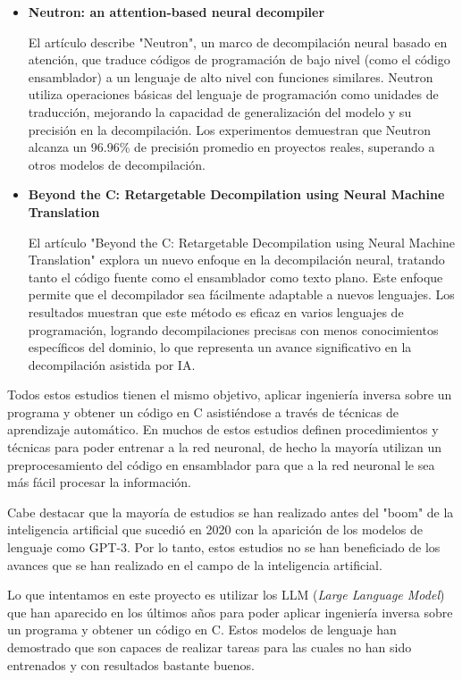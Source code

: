 \begin{itemize}
\item \textbf{Neutron: an attention-based neural decompiler} \cite{LiangRuigang2021Naan}

    El artículo describe "Neutron", un marco de decompilación neural basado en atención,
    que traduce códigos de programación de bajo nivel (como el código ensamblador) a un
    lenguaje de alto nivel con funciones similares. Neutron utiliza operaciones básicas
    del lenguaje de programación como unidades de traducción, mejorando la capacidad de
    generalización del modelo y su precisión en la decompilación. Los experimentos demuestran
    que Neutron alcanza un 96.96\% de precisión promedio en proyectos reales, superando a otros
    modelos de decompilación.

\item \textbf{Beyond the C: Retargetable Decompilation using Neural Machine Translation} \cite{HosseiniIman2022BtCR}

    El artículo "Beyond the C: Retargetable Decompilation using Neural Machine Translation"
    explora un nuevo enfoque en la decompilación neural, tratando tanto el código fuente como
    el ensamblador como texto plano. Este enfoque permite que el decompilador sea fácilmente
    adaptable a nuevos lenguajes. Los resultados muestran que este método es eficaz en varios
    lenguajes de programación, logrando decompilaciones precisas con menos conocimientos específicos
    del dominio, lo que representa un avance significativo en la decompilación asistida por IA.

\end{itemize}

Todos estos estudios tienen el mismo objetivo, aplicar ingeniería inversa sobre un programa
y obtener un código en C asistiéndose a través de técnicas de aprendizaje automático. En muchos
de estos estudios definen procedimientos y técnicas para poder entrenar a la red neuronal, de
hecho la mayoría utilizan un preprocesamiento del código en ensamblador para que a la red
neuronal le sea más fácil procesar la información.

Cabe destacar que la mayoría de estudios se han realizado antes del "boom" de la inteligencia artificial
que sucedió en 2020 con la aparición de los modelos de lenguaje como GPT-3. Por lo tanto, estos
estudios no se han beneficiado de los avances que se han realizado en el campo de la inteligencia
artificial.

Lo que intentamos en este proyecto es utilizar los LLM (\textit{Large Language Model}) que han aparecido
en los últimos años para poder aplicar ingeniería inversa sobre un programa y obtener un código
en C. Estos modelos de lenguaje han demostrado que son capaces de realizar tareas para las cuales
no han sido entrenados y con resultados bastante buenos.

